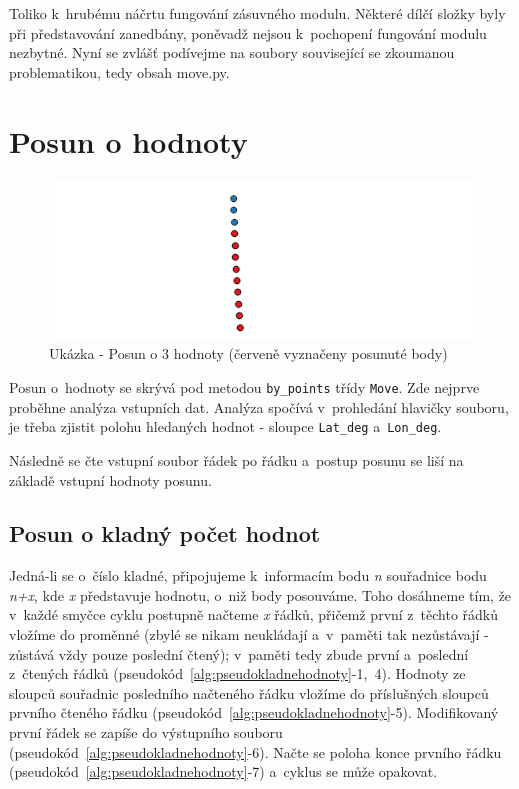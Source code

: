 Toliko k~hrubému náčrtu fungování zásuvného modulu. Některé dílčí složky byly při představování
zane\-dbány, poněvadž nejsou k~pochopení fungování mo\-dulu nezbytné. Nyní se zvlášť podívejme na
soubory související se zkoumanou pro\-blematikou, tedy obsah move.py. 


\section{Posun o hodnoty}
\label{by_points}

  \begin{figure}[H]
   \centering
	\includegraphics[scale=1]{./pictures/3-values-shift.png}
	\caption[Ukázka - Posun o 3 hodnoty]{Ukázka - Posun o 3 hodnoty (červeně vyznačeny posunuté body)
      \label{fig:values-shift}}
  \end{figure}

Posun o~hodnoty se skrývá pod metodou {\tt by\_points} třídy {\tt Move}.
Zde nejprve proběhne analýza vstupních dat.
Analýza spočívá v~prohledání hlavičky souboru, je třeba zjistit polohu hledaných hodnot - sloupce
{\tt Lat\_deg} a~{\tt Lon\_deg}. 

Následně se čte vstupní soubor řádek po řádku a~postup posunu se liší na základě vstupní hodnoty posunu. 

\subsection{Posun o kladný počet hodnot}
\label{kladnehodnoty}

Jedná-li se o~číslo kladné, připojujeme k~informacím bodu \textit{n} souřadnice bodu
\textit{n+x}, kde \textit{x} představuje hodnotu, o~niž body posouváme. Toho dosáhneme tím, že
v~každé smyčce cyklu postupně načteme \textit{x} řádků, přičemž první z~těchto řádků vložíme do proměnné
(zbylé se nikam neukládají a~v~paměti tak nezůstávají - zůstává vždy pouze poslední čtený);
v~paměti tedy zbude první a~poslední z~čtených řádků
(pseudokód~\ref{alg:pseudokladnehodnoty}-1,~4). Hodnoty ze sloupců souřadnic posledního
načteného řádku vložíme do příslušných sloupců prvního čteného řádku
(pseudokód~\ref{alg:pseudokladnehodnoty}-5). Modifikovaný první
řádek se zapíše do výstupního souboru (pseudokód~\ref{alg:pseudokladnehodnoty}-6).
Načte se poloha konce prvního řádku (pseudokód~\ref{alg:pseudokladnehodnoty}-7) a~cyklus se může opakovat. 

